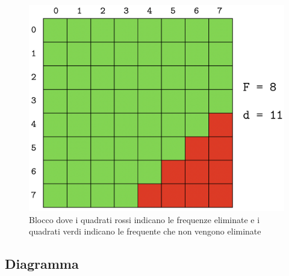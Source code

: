 \documentclass[preprint,12pt]{elsarticle}
\begin{document}
\begin{figure}[h]
	\centering
	\includegraphics[width=0.5\linewidth]{esempio}
	\caption{Blocco dove i quadrati rossi indicano le frequenze eliminate e i quadrati verdi indicano le frequente che non vengono eliminate}
\end{figure}


\subsection*{Diagramma}
\vspace{5mm}
\end{document}
